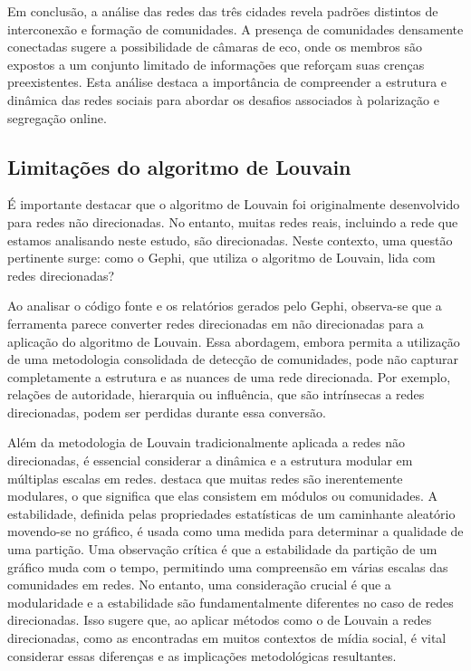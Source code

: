 Em conclusão, a análise das redes das três cidades revela padrões distintos de interconexão e formação de comunidades. A presença de comunidades densamente conectadas sugere a possibilidade de câmaras de eco, onde os membros são expostos a um conjunto limitado de informações que reforçam suas crenças preexistentes. Esta análise destaca a importância de compreender a estrutura e dinâmica das redes sociais para abordar os desafios associados à polarização e segregação online.

\subsection*{Limitações do algoritmo de Louvain}
\label{sec:limitacoes_louvain}

É importante destacar que o algoritmo de Louvain foi originalmente desenvolvido para redes não direcionadas. No entanto, muitas redes reais, incluindo a rede que estamos analisando neste estudo, são direcionadas. Neste contexto, uma questão pertinente surge: como o Gephi, que utiliza o algoritmo de Louvain, lida com redes direcionadas?

Ao analisar o código fonte \cite{2011_McSweeney} e os relatórios gerados pelo Gephi, observa-se que a ferramenta parece converter redes direcionadas em não direcionadas para a aplicação do algoritmo de Louvain. Essa abordagem, embora permita a utilização de uma metodologia consolidada de detecção de comunidades, pode não capturar completamente a estrutura e as nuances de uma rede direcionada. Por exemplo, relações de autoridade, hierarquia ou influência, que são intrínsecas a redes direcionadas, podem ser perdidas durante essa conversão.

Além da metodologia de Louvain tradicionalmente aplicada a redes não direcionadas, é essencial considerar a dinâmica e a estrutura modular em múltiplas escalas em redes.  destaca que muitas redes são inerentemente modulares, o que significa que elas consistem em módulos ou comunidades. A estabilidade, definida pelas propriedades estatísticas de um caminhante aleatório movendo-se no gráfico, é usada como uma medida para determinar a qualidade de uma partição. Uma observação crítica é que a estabilidade da partição de um gráfico muda com o tempo, permitindo uma compreensão em várias escalas das comunidades em redes. No entanto, uma consideração crucial é que a modularidade e a estabilidade são fundamentalmente diferentes no caso de redes direcionadas. Isso sugere que, ao aplicar métodos como o de Louvain a redes direcionadas, como as encontradas em muitos contextos de mídia social, é vital considerar essas diferenças e as implicações metodológicas resultantes.

